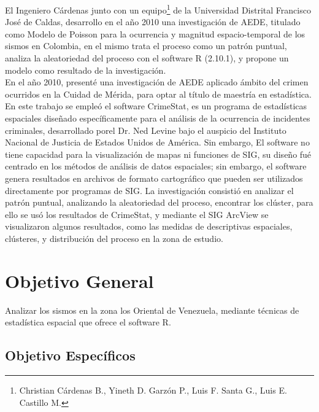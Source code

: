 \documentclass[12pt]{report}
\begin{document}
El Ingeniero Cárdenas \cite{Christian} junto con un equipo{\footnote{ Christian Cárdenas B., Yineth D. Garzón P., Luis F. Santa G., Luis E. Castillo M.}} de la Universidad Distrital Francisco José de Caldas, desarrollo en el año 2010  una investigación de AEDE, titulado como Modelo de Poisson para la ocurrencia y magnitud espacio-temporal de los sismos en Colombia, en el mismo trata el proceso como un patrón puntual, analiza la aleatoriedad del proceso con el software R (2.10.1), y propone un modelo como resultado de la investigación.\\
   
En el año 2010, presenté una investigación de AEDE aplicado ámbito del crimen ocurridos en la Cuidad de Mérida,  para optar al título de maestría en estadística. En este trabajo se empleó el software CrimeStat, es un programa de estadísticas espaciales diseñado específicamente para el análisis de la ocurrencia de incidentes criminales, desarrollado porel Dr. Ned Levine bajo el auspicio del Instituto Nacional de Justicia de Estados Unidos de América. Sin embargo, El software no tiene capacidad para la visualización de mapas ni funciones de SIG, su diseño fué  centrado en los métodos de análisis de datos espaciales; sin embargo, el software genera resultados en archivos de formato cartográfico que pueden ser utilizados directamente por programas de SIG. La investigación consistió en analizar el patrón puntual, analizando la aleatoriedad del proceso, encontrar los clúster, para ello se usó los resultados de CrimeStat, y mediante el SIG ArcView se visualizaron algunos resultados,  como las medidas de descriptivas espaciales, clústeres, y distribución del proceso en la zona de estudio.      


	
	
	
	
	
	
	
	\section{Objetivo General}
	
	Analizar los sismos en la zona los Oriental de Venezuela, mediante técnicas de estadística espacial que ofrece el software R.
	
                      

	\subsection{Objetivo Específicos}
\end{document}
